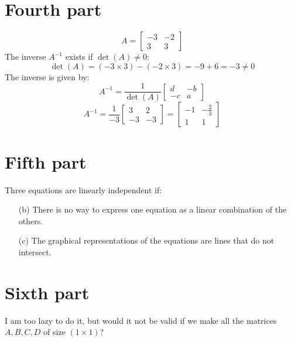 \documentclass{article}
\begin{document}
\section*{Fourth part}
\[
A = \begin{bmatrix} -3 & -2 \\ 3 & 3 \end{bmatrix}
\]
The inverse \(A^{-1}\) exists if \(\det(A) \neq 0\):
\[
\det(A) = (-3 \times 3) - (-2 \times 3) = -9 + 6 = -3 \neq 0
\]
The inverse is given by:
\[
A^{-1} = \frac{1}{\det(A)} \begin{bmatrix} d & -b \\ -c & a \end{bmatrix}
\]
\[
A^{-1} = \frac{1}{-3} \begin{bmatrix} 3 & 2 \\ -3 & -3 \end{bmatrix} = \begin{bmatrix} -1 & -\frac{2}{3} \\ 1 & 1 \end{bmatrix}
\]

\section*{Fifth part}
Three equations are linearly independent if:
\begin{enumerate}
    \item[(b)] There is no way to express one equation as a linear combination of the others.
    \item[(c)]   The graphical representations of the equations are lines that do not intersect. 

\end{enumerate}

\section*{Sixth part}
I am too lazy to do it, but would it not be valid if we make all the matrices \( A, B, C, D \) of size \( (1 \times 1) \)?  
\end{document}
